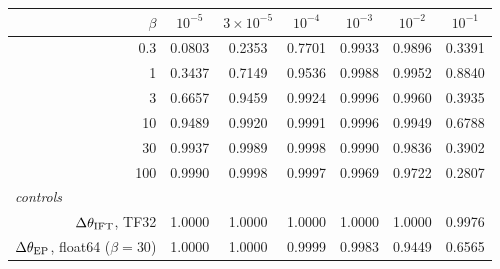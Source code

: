 \begin{tabular}{r cccccc}
\toprule
$\beta$ & $10^{-5}$ & $3\times10^{-5}$ & $10^{-4}$ & $10^{-3}$ & $10^{-2}$ & $10^{-1}$ \\ \midrule
0.3 & \cellcolor{gray!15}0.0803 & \cellcolor{gray!15}0.2353 & \cellcolor{gray!15}0.7701 & 0.9933 & \cellcolor{gray!15}0.9896 & \cellcolor{gray!15}0.3391 \\
1 & \cellcolor{gray!15}0.3437 & \cellcolor{gray!15}0.7149 & \cellcolor{gray!15}0.9536 & 0.9988 & 0.9952 & \cellcolor{gray!15}0.8840 \\
3 & \cellcolor{gray!15}0.6657 & \cellcolor{gray!15}0.9459 & 0.9924 & 0.9996 & 0.9960 & \cellcolor{gray!15}0.3935 \\
10 & \cellcolor{gray!15}0.9489 & 0.9920 & 0.9991 & 0.9996 & 0.9949 & \cellcolor{gray!15}0.6788 \\
30 & 0.9937 & 0.9989 & 0.9998 & 0.9990 & \cellcolor{gray!15}0.9836 & \cellcolor{gray!15}0.3902 \\
100 & 0.9990 & 0.9998 & 0.9997 & 0.9969 & \cellcolor{gray!15}0.9722 & \cellcolor{gray!15}0.2807 \\
\midrule
\multicolumn{7}{l}{\itshape controls} \\
$\Delta\theta_{\rm IFT}$, TF32 & 1.0000 & 1.0000 & 1.0000 & 1.0000 & 1.0000 & 0.9976 \\
$\Delta\theta_{\rm EP}$, float64 ($\beta{=}30$) & 1.0000 & 1.0000 & 0.9999 & 0.9983 & \cellcolor{gray!15}0.9449 & \cellcolor{gray!15}0.6565 \\
\bottomrule
\end{tabular}
